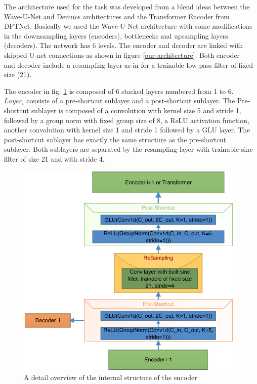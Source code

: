 \documentclass[final]{cvpr}
\begin{document}
The architecture used for the task was developed from a blend ideas between the Wave-U-Net \cite{waveunet} and Demucs \cite{defossez2019music} architectures and the Transformer Encoder from DPTNet\cite{dptnet}.
Basically we used the Wave-U-Net \cite{waveunet} architecture with some modifications in the downsampling layers (encoders), bottlenecks and upsampling layers (decoders).
The network has 6 levels. The encoder and decoder are linked with skipped U-net connections as shown in figure \ref{our-architecture}. Both encoder and decoder include a resampling layer as in \cite{waveunet} for a trainable low-pass filter of fixed size (21). 

The encoder in fig. \ref{encoder} is composed of 6 stacked layers numbered from 1 to 6. $Layer_i$ consists of a pre-shortcut sublayer and a post-shortcut sublayer. The Pre-shortcut sublayer is composed of a convolution with kernel size 5 and stride 1, followed by a group norm with fixed group size of 8, a ReLU activation function, another convolution with kernel size 1 and stride 1 followed by a GLU layer. The post-shortcut sublayer has exactly the same structure as the pre-shortcut sublayer. Both sublayers are separated by the resampling layer \cite{waveunet} with trainable sinc filter of size 21 and with stride 4.

\begin{figure}
   \includegraphics[scale=0.3]{encoder.png}
   \caption{A detail overview of the internal structure of the encoder}
   \label{encoder}
\end{figure}
\end{document}
